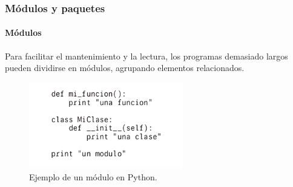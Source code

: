 \begin{frame}[fragile]
  \frametitle{M\'odulos y paquetes}

  \framesubtitle{M\'odulos}

  Para facilitar el mantenimiento y la lectura, los programas demasiado largos pueden dividirse en m\'odulos, agrupando elementos relacionados.

  \begin{figure}
    \includegraphics[width=0.6\textwidth]{Imagenes/Modulo.jpg}
    \caption{\label{fig:Ejemplo9}Ejemplo de un m\'odulo en Python.}
  \end{figure}

 

\end{frame}
